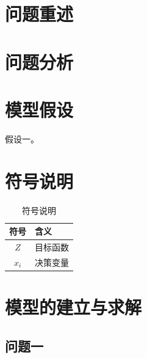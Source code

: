 \documentclass[12pt]{article}
\begin{document}

\begin{abstract}
摘要正文。一段话说清问题、方法、关键结果、亮点。
\end{abstract}

\section{问题重述}

\section{问题分析}

\section{模型假设}

\begin{modelassumptions}
  \item 假设一。
\end{modelassumptions}

\section{符号说明}

\begin{table}[!htbp]
  \centering
  \caption{符号说明}
  \begin{tabular}{cl}
    \toprule
    符号 & 含义 \\
    \midrule
    $Z$ & 目标函数 \\
    $x_i$ & 决策变量 \\
    \bottomrule
  \end{tabular}
\end{table}

\section{模型的建立与求解}

\subsection{问题一}

\end{document}
